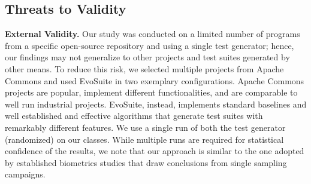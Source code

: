 \documentclass[sigconf,review,anonymous]{acmart}
\begin{document}





\subsection{Threats to Validity}

\noindent\textbf{External Validity.}
Our study was conducted on a limited number of programs from a specific
open-source repository and using a single test generator; hence, our findings
may not generalize to other projects and test suites generated by other means.
%
To reduce this risk, we selected multiple projects from Apache Commons and
used EvoSuite in two exemplary configurations.
%
Apache Commons projects are popular, implement different functionalities, and
are comparable to %
well run industrial projects.
EvoSuite, instead, implements standard baselines %
and
well established and effective algorithms %
that generate test suites with remarkably different features.
We use a single run of both the test generator (randomized) on our classes.
%
While multiple runs are required for statistical confidence of the results,
we note that our approach is similar to the one adopted by established biometrics
studies that draw conclusions from single sampling campaigns.
\end{document}
